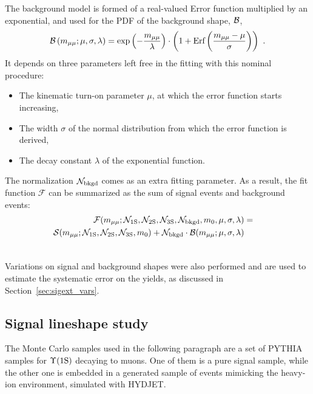 The background model is formed of a real-valued Error function
multiplied by an exponential, and used for the PDF of the background shape, ${\cal B}$,
% 
\begin{equation}
{\cal B} \left( m_{\mu\mu}; \mu, \sigma, \lambda \right)  =
\exp\left( { -\frac{m_{\mu\mu}}{\lambda}} \right) \cdot \left(1  +
  \text{Erf}  \left(  \frac{m_{\mu\mu} - \mu}{\sigma}  \right) \right)
\ .
\label{eq:TheBackgroundPDF}
\end{equation}
It depends on three parameters
left free in the fitting with this nominal procedure:
%
\begin{itemize}
\item{The kinematic turn-on parameter $\mu$, at which the error
    function starts increasing, }
\item{The width $\sigma$ of the normal distribution from which the error function is
    derived,}
\item{The decay constant $\lambda$ of the exponential function.}
\end{itemize}
%
The normalization ${\cal N}_{\rm bkgd}$ comes as an extra fitting parameter.
 As a result, the fit function $\mathcal{F}$ can be summarized as the sum
of signal events and background events:
\begin{eqnarray}
  {\cal F}(m_{\mu\mu} ; {\cal N}_{\rm 1S}, {\cal N}_{\rm 2S}, {\cal N}_{\rm 3S}, {\cal N}_{\rm bkgd}, m_{0},
  \mu, \sigma, \lambda) &=& \\
{\cal S}(m_{\mu\mu}; {\cal N}_{\rm 1S}, {\cal N}_{\rm 2S}, {\cal N}_{\rm 3S}, m_{0}) 
  + {\cal N}_{\rm bkgd} \cdot {\cal B}(m_{\mu\mu};  \mu, \sigma, \lambda)
  \nonumber \\
  &&  \label{eq:ThePDF}
\end{eqnarray}


Variations on signal and background
shapes were also performed and are used to estimate the systematic
error on the yields, as discussed in Section~\ref{sec:sigext_vars}.
\subsection{Signal lineshape study}
%
\label{sec:sigext_FSR}

The Monte Carlo samples used in the following paragraph are a set of \textsc{PYTHIA}
samples for $\Upsilon\mathrm{(1S)}$ decaying to muons. One of them is a pure signal
sample, while the other one is embedded in a generated sample of events mimicking
the heavy-ion environment, simulated with \textsc{HYDJET}.%

